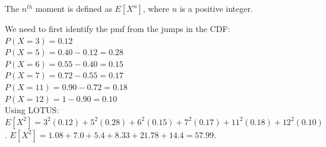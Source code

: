 \documentclass[12pt]{article}
\begin{document}
\begin{enumerate}
The $n^{th}$ moment is defined as $E[X^n]$, where $n$ is a positive integer. 

We need to first identify the pmf from the jumps in the CDF:\\
$P(X=3) = 0.12$\\$P(X=5) = 0.40 - 0.12 = 0.28$\\$P(X=6) = 0.55 - 0.40 = 0.15$\\$P(X=7) = 0.72 - 0.55 = 0.17$\\$P(X=11) = 0.90 - 0.72 = 0.18$\\$P(X=12) = 1 - 0.90 = 0.10$\\
Using LOTUS: $E[X^2] = 3^2(0.12) + 5^2(0.28) + 6^2(0.15) + 7^2(0.17) + 11^2(0.18) + 12^2(0.10)$.
$E[X^2] = 1.08 + 7.0 + 5.4 + 8.33 + 21.78 + 14.4 = \mathbf{57.99}$.  



\end{enumerate}


\end{document}
